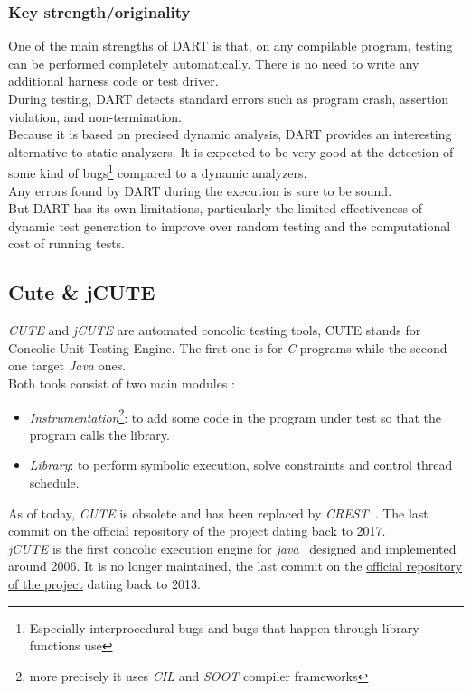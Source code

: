 \documentclass[11pt]{IEEEtran}
\begin{document}
	    \subsubsection{Key strength/originality}
	    	One of the main strengths of DART is that, on any compilable program, testing can be performed completely automatically. There is no need to write any additional harness code or test driver.\\
	    	During testing, DART detects standard errors such as program crash, assertion violation, and non-termination.\\
	    	Because it is based on precised dynamic analysis, DART provides an interesting alternative to static analyzers. It is expected to be very good at the detection of some kind of bugs\footnote{Especially interprocedural bugs and bugs that happen through library functions use} compared to a dynamic analyzers.\\
	    	Any errors found by DART during the execution is sure to be sound.\\

	    	But DART has its own limitations, particularly the limited effectiveness of dynamic test generation to improve over random testing and the computational cost of running tests.

	\subsection{Cute \& jCUTE}
		\emph{CUTE} and \emph{jCUTE} are automated concolic testing tools, CUTE stands for Concolic Unit Testing Engine\cite{sen2006cute}. The first one is for \emph{C} programs while the second one target \emph{Java} ones.\\

		Both tools consist of two main modules :
		\begin{itemize}
			\item \emph{Instrumentation}\footnote{more precisely it uses \emph{CIL} and \emph{SOOT} compiler frameworks}: to add some code in the program under test so that the program calls the library.
			\item \emph{Library}: to perform symbolic execution, solve constraints and control thread schedule.
		\end{itemize}

		As of today, \emph{CUTE} is obsolete and has been replaced by \emph{CREST}~\cite{CuteWebSite}. The last commit on the \href{https://github.com/jburnim/crest}{official repository of the project} dating back to 2017. \\
		\emph{jCUTE} is the first concolic execution engine for \emph{java}~\cite{jDart} designed and implemented around 2006. It is no longer maintained, the last commit on the \href{https://github.com/osl/jcute}{official repository of the project} dating back to 2013.
\end{document}
